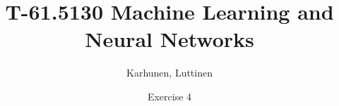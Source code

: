 \title{T-61.5130 Machine Learning and Neural Networks}
\author{Karhunen, Luttinen}
\date{Exercise 4}


\newcommand{\vect}[1]{{\bf{#1}}}
\newcommand{\svect}[1]{\boldsymbol{#1}}
\newcommand{\matr}[1]{\boldsymbol{#1}}




\maketitle
\thispagestyle{empty}

